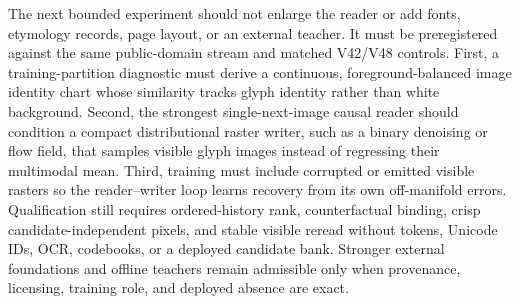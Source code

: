 \documentclass[11pt]{article}
\begin{document}
The next bounded experiment should not enlarge the reader or add fonts,
etymology records, page layout, or an external teacher. It must be
preregistered against the same public-domain stream and matched V42/V48
controls. First, a training-partition diagnostic must derive a continuous,
foreground-balanced image identity chart whose similarity tracks glyph
identity rather than white background. Second, the strongest single-next-image
causal reader should condition a compact distributional raster writer, such as
a binary denoising or flow field, that samples visible glyph images instead of
regressing their multimodal mean. Third, training must include corrupted or
emitted visible rasters so the reader--writer loop learns recovery from its own
off-manifold errors. Qualification still requires ordered-history rank,
counterfactual binding, crisp candidate-independent pixels, and stable visible
reread without tokens, Unicode IDs, OCR, codebooks, or a deployed candidate
bank. Stronger external foundations and offline teachers remain admissible
only when provenance, licensing, training role, and deployed absence are exact.
\end{document}
